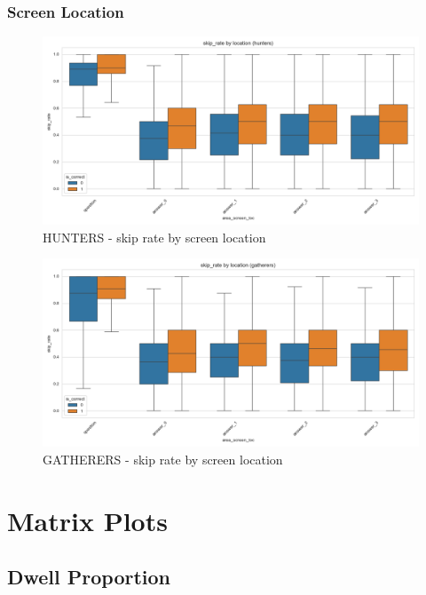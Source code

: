 \documentclass{article}
\begin{document}
\subsubsection{Screen Location}

\begin{figure}[H]
    \centering
    \includegraphics[width=0.8\linewidth]{plots/boxplots/boxplot_area_screen_loc_skip_rate_hunters.png}
    \caption{HUNTERS - skip rate by screen location}
    \label{fig:sr_hunt_sl}
\end{figure}

\begin{figure}[H]
    \centering
    \includegraphics[width=0.8\linewidth]{plots/boxplots/boxplot_area_screen_loc_skip_rate_gatherers.png}
    \caption{GATHERERS - skip rate by screen location}
    \label{fig:sr_gath_sl}
\end{figure}



\section{Matrix Plots}

\subsection{Dwell Proportion}
\end{document}
